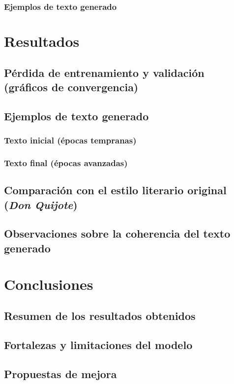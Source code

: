 \documentclass{article}
\begin{document}
\subsubsection{Ejemplos de texto generado}

\section{Resultados}
\subsection{Pérdida de entrenamiento y validación (gráficos de convergencia)}
\subsection{Ejemplos de texto generado}
\subsubsection{Texto inicial (épocas tempranas)}
\subsubsection{Texto final (épocas avanzadas)}
\subsection{Comparación con el estilo literario original (\textit{Don Quijote})}
\subsection{Observaciones sobre la coherencia del texto generado}

\newpage

\section{Conclusiones}
\subsection{Resumen de los resultados obtenidos}
\subsection{Fortalezas y limitaciones del modelo}
\subsection{Propuestas de mejora}
\end{document}
